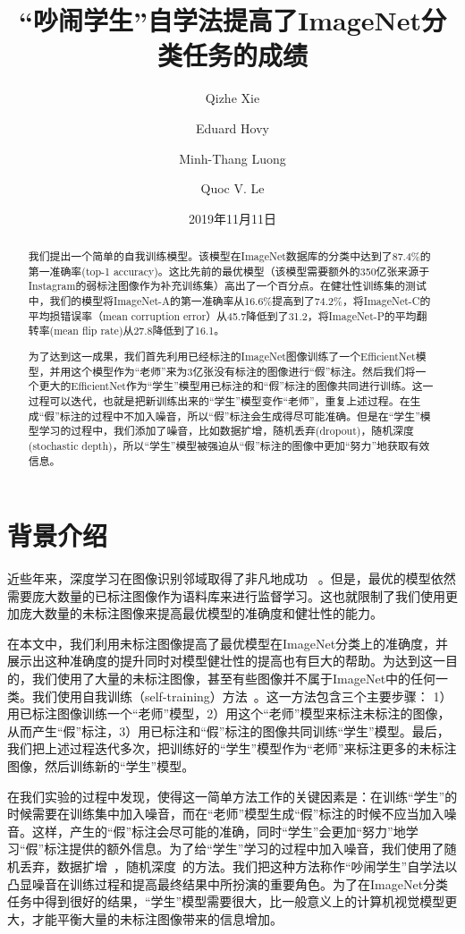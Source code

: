 \documentclass[10pt]{article}
\title{“吵闹学生”自学法提高了ImageNet分类任务的成绩}
\author[1]{Qizhe Xie}
\author[2]{Eduard Hovy}
\author[1]{Minh-Thang Luong}
\author[1]{Quoc V. Le}
\affil[1]{Google Research, Brain Team}
\affil[2]{Carnegie Mellon University \protect\\}
\affil[ ]{\tt\small \{qizhex, thangluong, qvl\}@google.com, hovy@cmu.edu}
\date{\small 2019年11月11日}
\begin{document}
\maketitle
\begin{abstract}
我们提出一个简单的自我训练模型。该模型在\-ImageNet数据库的分类中达到了87.4\%的第一准确率(top-1 accuracy)。这比先前的最优模型（该模型需要额外的350亿张来源于Instagram的弱标注图像作为补充训练集）高出了一个百分点。在健壮性训练集的测试中，我们的模型将\-ImageNet-A\-的第一准确率从16.6\%提高到了74.2\%，将\-ImageNet-C的平均损错误率（mean corruption error）从45.7降低到了31.2，将\-ImageNet-P的平均翻转率(mean flip rate)从27.8降低到了16.1。  


为了达到这一成果，我们首先利用已经标注的\-ImageNet图像训练了一个EfficientNet模型，并用这个模型作为“老师”来为3亿张没有标注的图像进行“假”标注。然后我们将一个更大的EfficientNet作为“学生”模型用已标注的和“假”标注的图像共同进行训练。这一过程可以迭代，也就是把新训练出来的“学生”模型变作“老师”，重复上述过程。在生成“假”标注的过程中不加入噪音，所以“假”标注会生成得尽可能准确。但是在“学生”模型学习的过程中，我们添加了噪音，比如数据扩增，随机丢弃(dropout)，随机深度(stochastic depth)，所以“学生”模型被强迫从“假”标注的图像中更加“努力”地获取有效信息。  
\end{abstract}

\section{背景介绍}

近些年来，深度学习在图像识别邻域取得了非凡地成功
~\cite{krizhevsky2012imagenet, szegedy2015going, simonyan2014very, he2016deep, tan2019efficientnet}。但是，最优的模型依然需要庞大数量的已标注图像作为语料库来进行监督学习。这也就限制了我们使用更加庞大数量的未标注图像来提高最优模型的准确度和健壮性的能力。  


在本文中，我们利用未标注图像提高了最优模型在ImageNet分类上的准确度，并展示出这种准确度的提升同时对模型健壮性的提高也有巨大的帮助。为达到这一目的，我们使用了大量的未标注图像，甚至有些图像并不属于ImageNet中的任何一类。我们使用自我训练（self-training）方法~\cite{scudder1965probability}。这一方法包含三个主要步骤： 1）用已标注图像训练一个“老师”模型，2）用这个“老师”模型来标注未标注的图像，从而产生“假”标注，3）用已标注和“假”标注的图像共同训练“学生”模型。最后，我们把上述过程迭代多次，把训练好的“学生”模型作为“老师”来标注更多的未标注图像，然后训练新的“学生”模型。  


在我们实验的过程中发现，使得这一简单方法工作的关键因素是：在训练“学生”的时候需要在训练集中加入噪音，而在“老师”模型生成“假”标注的时候不应当加入噪音。这样，产生的“假”标注会尽可能的准确，同时“学生”会更加“努力”地学习“假”标注提供的额外信息。为了给“学生”学习的过程中加入噪音，我们使用了随机丢弃\cite{srivastava2014dropout}，数据扩增~\cite{cubuk2019RandAugment}，随机深度~\cite{huang2016deep}的方法。我们把这种方法称作“吵闹学生”自学法以凸显噪音在训练过程和提高最终结果中所扮演的重要角色。为了在ImageNet分类任务中得到很好的结果，“学生”模型需要很大，比一般意义上的计算机视觉模型更大，才能平衡大量的未标注图像带来的信息增加。  
\end{document}
